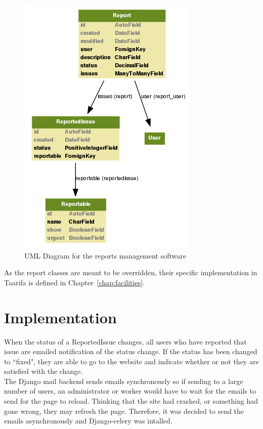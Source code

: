 \begin{figure}[h]
\includegraphics[scale=0.8]{img/reports}
\caption{UML Diagram for the reports management software}
\label{fig:umlreports}
\end{figure}

As the report classes are meant to be overridden, their specific implementation in Taarifa is defined in Chapter~\ref{chap:facilities}.

\section{Implementation}
When the status of a ReportedIssue changes, all users who have reported that issue are emailed notification of the status change. If the status has been changed to ``fixed", they are able to go to the website and indicate whether or not they are satisfied with the change. \\
The Django mail backend sends emails synchronously so if sending to a large number of users, an administrator or worker would have to wait for the emails to send for the page to reload. Thinking that the site had crashed, or something had gone wrong, they may refresh the page. Therefore, it was decided to send the emails asynchronously and Django-celery was intalled.


